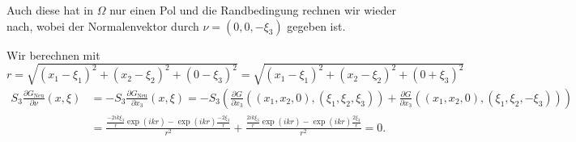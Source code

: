 \begin{solution}
\begin{enumerate}[label = (\roman*)]
Auch diese hat in $\Omega$ nur einen Pol und die Randbedingung rechnen wir wieder nach, wobei der Normalenvektor durch $\nu = (0,0,-\xi_3)$ gegeben ist.


Wir berechnen mit $r = \sqrt{(x_1-\xi_1)^2 + (x_2-\xi_2)^2 + (0-\xi_3)^2} =
\sqrt{(x_1-\xi_1)^2 + (x_2-\xi_2)^2 + (0+\xi_3)^2}$
\begin{align*}
S_3\frac{\partial G_\mathrm{Neu}}{\partial \nu}(x, \xi)
&=
-S_3\frac{\partial G_\mathrm{Neu}}{\partial x_3}(x, \xi)
=
-S_3(\frac{\partial G}{\partial x_3}((x_1,x_2,0),(\xi_1, \xi_2, \xi_3)) + \frac{\partial G}{\partial x_3}((x_1,x_2,0),(\xi_1,\xi_2, -\xi_3))) \\
&= \frac{\frac{-2ik\xi_3}{r}\exp(ikr) - \exp(ikr)\frac{-2\xi_3}{r}}{r^2}
+ \frac{\frac{2ik\xi_3}{r}\exp(ikr) - \exp(ikr)\frac{2\xi_3}{r}}{r^2} = 0.
\end{align*}
\end{enumerate}
\end{solution}

